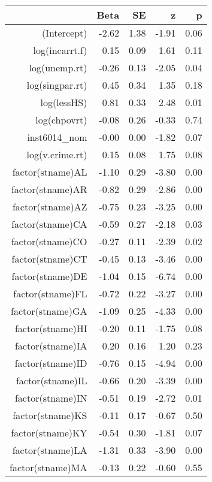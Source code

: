\begin{table}[ht]
\centering
\begin{tabular}{rrrrr}
  \hline
 & Beta & SE & z & p \\ 
  \hline
(Intercept) & -2.62 & 1.38 & -1.91 & 0.06 \\ 
  log(incarrt.f) & 0.15 & 0.09 & 1.61 & 0.11 \\ 
  log(unemp.rt) & -0.26 & 0.13 & -2.05 & 0.04 \\ 
  log(singpar.rt) & 0.45 & 0.34 & 1.35 & 0.18 \\ 
  log(lessHS) & 0.81 & 0.33 & 2.48 & 0.01 \\ 
  log(chpovrt) & -0.08 & 0.26 & -0.33 & 0.74 \\ 
  inst6014\_nom & -0.00 & 0.00 & -1.82 & 0.07 \\ 
  log(v.crime.rt) & 0.15 & 0.08 & 1.75 & 0.08 \\ 
  factor(stname)AL & -1.10 & 0.29 & -3.80 & 0.00 \\ 
  factor(stname)AR & -0.82 & 0.29 & -2.86 & 0.00 \\ 
  factor(stname)AZ & -0.75 & 0.23 & -3.25 & 0.00 \\ 
  factor(stname)CA & -0.59 & 0.27 & -2.18 & 0.03 \\ 
  factor(stname)CO & -0.27 & 0.11 & -2.39 & 0.02 \\ 
  factor(stname)CT & -0.45 & 0.13 & -3.46 & 0.00 \\ 
  factor(stname)DE & -1.04 & 0.15 & -6.74 & 0.00 \\ 
  factor(stname)FL & -0.72 & 0.22 & -3.27 & 0.00 \\ 
  factor(stname)GA & -1.09 & 0.25 & -4.33 & 0.00 \\ 
  factor(stname)HI & -0.20 & 0.11 & -1.75 & 0.08 \\ 
  factor(stname)IA & 0.20 & 0.16 & 1.20 & 0.23 \\ 
  factor(stname)ID & -0.76 & 0.15 & -4.94 & 0.00 \\ 
  factor(stname)IL & -0.66 & 0.20 & -3.39 & 0.00 \\ 
  factor(stname)IN & -0.51 & 0.19 & -2.72 & 0.01 \\ 
  factor(stname)KS & -0.11 & 0.17 & -0.67 & 0.50 \\ 
  factor(stname)KY & -0.54 & 0.30 & -1.81 & 0.07 \\ 
  factor(stname)LA & -1.31 & 0.33 & -3.90 & 0.00 \\ 
  factor(stname)MA & -0.13 & 0.22 & -0.60 & 0.55 \\ 

\end{tabular}
\end{table}
